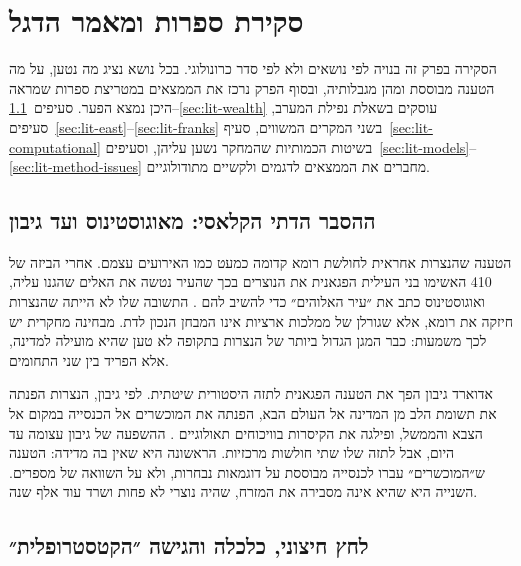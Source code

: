 
\chapter{סקירת ספרות ומאמר הדגל}
\label{ch:literature}

הסקירה בפרק זה בנויה לפי נושאים ולא לפי סדר כרונולוגי. בכל נושא נציג מה נטען, על מה הטענה מבוססת ומהן מגבלותיה, ובסוף הפרק נרכז את הממצאים במטריצת ספרות שמראה היכן נמצא הפער. סעיפים~\ref{sec:lit-classic}--\ref{sec:lit-wealth} עוסקים בשאלת נפילת המערב, סעיפים~\ref{sec:lit-east}--\ref{sec:lit-franks} בשני המקרים המשווים, סעיף~\ref{sec:lit-computational} בשיטות הכמותיות שהמחקר נשען עליהן, וסעיפים~\ref{sec:lit-models}--\ref{sec:lit-method-issues} מחברים את הממצאים לדגמים ולקשיים מתודולוגיים.

\section{ההסבר הדתי הקלאסי: מאוגוסטינוס ועד גיבון}
\label{sec:lit-classic}

הטענה שהנצרות אחראית לחולשת רומא קדומה כמעט כמו האירועים עצמם. אחרי הביזה של 410 האשימו בני העילית הפגאנית את הנוצרים בכך שהעיר נטשה את האלים שהגנו עליה, ואוגוסטינוס כתב את ״עיר האלוהים״ כדי להשיב להם \cite{augustine_citygod}. התשובה שלו לא הייתה שהנצרות חיזקה את רומא, אלא שגורלן של ממלכות ארציות אינו המבחן הנכון לדת. מבחינה מחקרית יש לכך משמעות: כבר המגן הגדול ביותר של הנצרות בתקופה לא טען שהיא מועילה למדינה, אלא הפריד בין שני התחומים.

אדוארד גיבון הפך את הטענה הפגאנית לתזה היסטורית שיטתית. לפי גיבון, הנצרות הפנתה את תשומת הלב מן המדינה אל העולם הבא, הפנתה את המוכשרים אל הכנסייה במקום אל הצבא והממשל, ופילגה את הקיסרות בוויכוחים תאולוגיים \cite{gibbon_decline}. ההשפעה של גיבון עצומה עד היום, אבל לתזה שלו שתי חולשות מרכזיות. הראשונה היא שאין בה מדידה: הטענה ש״המוכשרים״ עברו לכנסייה מבוססת על דוגמאות נבחרות, ולא על השוואה של מספרים. השנייה היא שהיא אינה מסבירה את המזרח, שהיה נוצרי לא פחות ושרד עוד אלף שנה.

\section{לחץ חיצוני, כלכלה והגישה ״הקטסטרופלית״}
\label{sec:lit-external}


